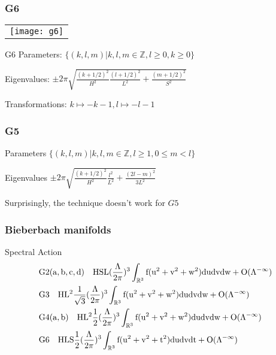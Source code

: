 \documentclass{beamer}
\def\Z{{\mathbb Z}}
\def\R{{\mathbb R}}
\begin{document}
\begin{frame}
\frametitle{G6}
    \begin{tabular}[]{l}
	\texttt{[image: g6]}\\
    \end{tabular}
    \begin{block}{G6}
      Parameters: $\{(k,l,m)| k,l,m \in \Z, l \geq 0, k\geq 0\}$

      Eigenvalues: $\pm 2\pi\sqrt{\frac{(k+1/2)^2}{H^2}\frac{(l+1/2)^2}{L^2} + \frac{(m + 1/2)^2}{S^2}}$
      
      Transformations: $k\mapsto -k - 1, l \mapsto -l -1$
    \end{block}
\end{frame}

\begin{frame}
  \frametitle{G5}
  \begin{block}{Parameters}
    $\{(k,l,m)| k,l,m \in \Z, l \geq 1, 0 \leq m < l\}$
  \end{block}

  \begin{block}{Eigenvalues}
    $\pm 2\pi\sqrt{\frac{(k+1/2)^2}{H^2}\frac{l^2}{L^2} + \frac{(2l- m)^2}{3L^2}}$
  \end{block}

  \pause

  \begin{block}{}
    Surprisingly, the technique doesn't work for $G5$
  \end{block}
\end{frame}

\begin{frame}
\frametitle{Bieberbach manifolds}
\begin{block}{Spectral Action}
\begin{align*}
&\rm{G2(a,b,c,d)} \quad HSL(\frac{\Lambda}{2\pi})^3 \int_{\R ^3} f(u^2 +v^2 + w^2)dudvdw + O(\Lambda^{-\infty})\\
&\rm{G3} \quad HL^2 \frac{1}{\sqrt{3}}(\frac{\Lambda}{2\pi})^3 \int_{\R ^3} f(u^2 +v^2 + w^2)dudvdw + O(\Lambda^{-\infty})\\
&\rm{G4(a,b)} \quad HL^2 \frac{1}{2}(\frac{\Lambda}{2\pi})^3 \int_{\R ^3} f(u^2 +v^2 + w^2)dudvdw + O(\Lambda^{-\infty})\\
&\rm{G6} \quad HLS \frac{1}{2}(\frac{\Lambda}{2\pi})^3 \int_{\R ^3} f(u^2 +v^2 + t^2)dudvdt + O(\Lambda^{-\infty})\\
\end{align*}
\end{block}
\end{frame}
\end{document}
